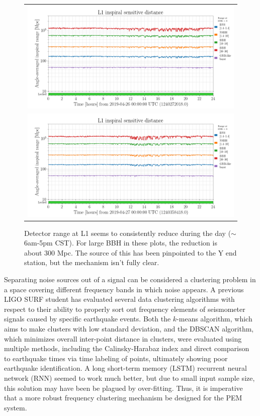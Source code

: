 \begin{figure}
  \begin{minipage}[c]{0.67\textwidth}
  \begin{tabular}{c}
  \includegraphics[width=\textwidth]{assets/L1-LOCKED_216737_RANGE-1240272018-86400.png}   \\  \includegraphics[width=\textwidth]{assets/L1-LOCKED_216737_RANGE-1240358418-86400.png}
  \end{tabular}
  \end{minipage}\hfill
  \begin{minipage}[t]{0.3\textwidth}
    \caption{Detector range at L1 seems to consistently reduce during the day ($\sim$6am-5pm CST). For large BBH in these plots, the reduction is about 300 Mpc. The source of this has been pinpointed to the Y end station, but the mechanism isn't fully clear.}
  \end{minipage}
\end{figure}

Separating noise sources out of a signal can be considered a clustering problem in a space covering different frequency bands in which noise appears.
A previous LIGO SURF student has evaluated several data clustering algorithms with respect to their ability to properly sort out frequency elements of seismometer signals caused by specific earthquake events\cite{roxana}.
Both the $k$-means algorithm, which aims to make clusters with low standard deviation, and the DBSCAN algorithm, which minimizes overall inter-point distance in clusters, were evaluated using multiple methods, including the Calinsky-Harabaz  index and direct comparison to earthquake times via time labeling of points, ultimately showing poor earthquake identification.
A long short-term memory (LSTM) recurrent neural network (RNN) seemed to work much better, but due to small input sample size, this solution may have been be plagued by over-fitting.
Thus, it is imperative that a more robust frequency clustering mechanism be designed for the PEM system.

